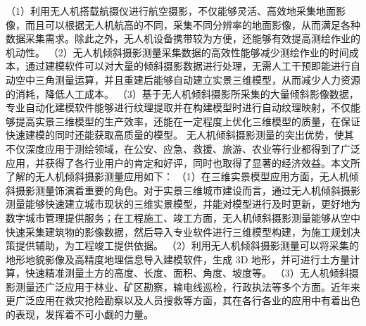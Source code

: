 （1）利用无人机搭载航摄仪进行航空摄影，不仅能够灵活、高效地采集地面影像，而且可以根据无人机航高的不同，采集不同分辨率的地面影像，从而满足各种数据采集需求。除此之外，无人机设备携带较为方便，还能够有效提高测绘作业的机动性。
（2）无人机倾斜摄影测量采集数据的高效性能够减少测绘作业的时间成本，通过建模软件可以对大量的倾斜摄影数据进行处理，无需人工干预即能进行自动空中三角测量运算，并且重建后能够自动建立实景三维模型，从而减少人力资源的消耗，降低人工成本。
（3）基于无人机倾斜摄影所采集的大量倾斜影像数据，专业自动化建模软件能够进行纹理提取并在构建模型时进行自动纹理映射，不仅能够提高实景三维模型的生产效率，还能在一定程度上优化三维模型的质量，在保证快速建模的同时还能获取高质量的模型。
无人机倾斜摄影测量的突出优势，使其不仅深度应用于测绘领域，在公安、应急、救援、旅游、农业等行业都得到了广泛应用，并获得了各行业用户的肯定和好评，同时也取得了显著的经济效益。本文所了解的无人机倾斜摄影测量应用如下：
（1）在三维实景模型应用方面，无人机倾斜摄影测量饰演着重要的角色。对于实景三维城市建设而言，通过无人机倾斜摄影测量能够快速建立城市现状的三维实景模型，并能对模型进行及时更新，更好地为数字城市管理提供服务；在工程施工、竣工方面，无人机倾斜摄影测量能够从空中快速采集建筑物的影像数据，然后导入专业软件进行三维模型构建，为施工规划决策提供辅助，为工程竣工提供依据。
（2）利用无人机倾斜摄影测量可以将采集的地形地貌影像及高精度地理信息导入建模软件，生成 3D 地形，并可进行土方量计算，快速精准测量土方的高度、长度、面积、角度、坡度等。
（3）无人机倾斜摄影测量还广泛应用于林业、矿区勘察，输电线巡检，行政执法等多个方面。近年来更广泛应用在救灾抢险勘察以及人员搜救等方面，其在各行各业的应用中有着出色的表现，发挥着不可小觑的力量。
